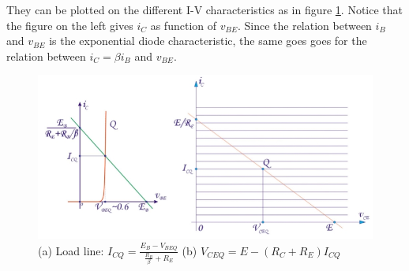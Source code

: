 They can be plotted on the different I-V characteristics as in figure \ref{fig:general2}. Notice that the figure on the left gives $i_C$ as function of $v_{BE}$. Since the relation between $i_B$ and $v_{BE}$ is the exponential diode characteristic, the same goes goes for the relation between $i_C = \beta i_B$ and $v_{BE}$.
\begin{figure}[h!]
	\centering
	\includegraphics[width=12cm]{figures/ch02/general2.jpg}
	\caption{(a) Load line: $I_{CQ} = \frac{E_B - V_{BEQ}}{\frac{R_B}{\beta} + R_E}$ (b) $V_{CEQ} = E - (R_C + R_E) I_{CQ}$}
	\label{fig:general2}
\end{figure}


